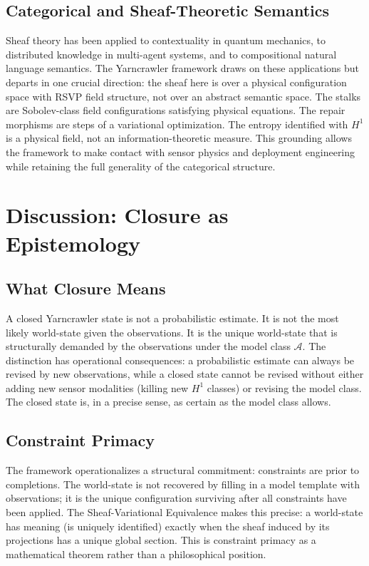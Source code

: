 \documentclass[11pt, oneside]{article}
\begin{document}
\subsection{Categorical and Sheaf-Theoretic Semantics}

Sheaf theory has been applied to contextuality in quantum mechanics, to distributed
knowledge in multi-agent systems, and to compositional natural language semantics. The
Yarncrawler framework draws on these applications but departs in one crucial direction:
the sheaf here is over a physical configuration space with RSVP field structure, not over
an abstract semantic space. The stalks are Sobolev-class field configurations satisfying
physical equations. The repair morphisms are steps of a variational optimization. The
entropy identified with $H^1$ is a physical field, not an information-theoretic measure.
This grounding allows the framework to make contact with sensor physics and deployment
engineering while retaining the full generality of the categorical structure.

\section{Discussion: Closure as Epistemology}
\label{sec:epistemology}

\subsection{What Closure Means}

A closed Yarncrawler state is not a probabilistic estimate. It is not the most likely
world-state given the observations. It is the unique world-state that is structurally
demanded by the observations under the model class $\mathcal{A}$. The distinction has
operational consequences: a probabilistic estimate can always be revised by new
observations, while a closed state cannot be revised without either adding new sensor
modalities (killing new $H^1$ classes) or revising the model class. The closed state is,
in a precise sense, as certain as the model class allows.

\subsection{Constraint Primacy}

The framework operationalizes a structural commitment: constraints are prior to
completions. The world-state is not recovered by filling in a model template with
observations; it is the unique configuration surviving after all constraints have been
applied. The Sheaf-Variational Equivalence makes this precise: a world-state has meaning
(is uniquely identified) exactly when the sheaf induced by its projections has a unique
global section. This is constraint primacy as a mathematical theorem rather than a
philosophical position.
\end{document}
